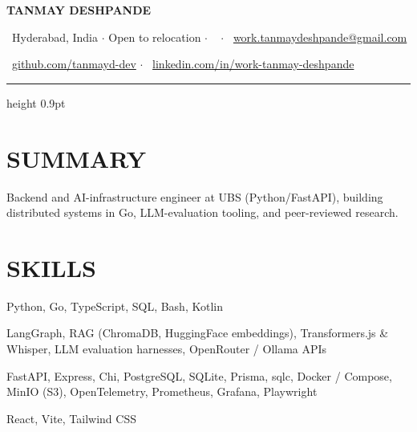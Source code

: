 \documentclass[10pt,a4paper]{article}
\newif\ifpublic
\newcommand{\contactphone}{}
\begin{document}
{\fontsize{23}{25}\selectfont\bfseries\color{accent} TANMAY DESHPANDE}\par
\vspace{3pt}
{\small\color{muted}
  \faMapMarker~Hyderabad, India \;$\cdot$\; Open to relocation
  \ifpublic\else\ifx\contactphone\empty\else\;$\cdot$\; \faPhone~\contactphone\fi\fi
  \;$\cdot$\; \faEnvelope~\href{mailto:work.tanmaydeshpande@gmail.com}{work.tanmaydeshpande@gmail.com}\par
  \vspace{1pt}
  \faGithub~\href{https://github.com/tanmayd-dev}{github.com/tanmayd-dev}
  \;$\cdot$\; \faLinkedin~\href{https://www.linkedin.com/in/work-tanmay-deshpande}{linkedin.com/in/work-tanmay-deshpande}
}\par
\vspace{2pt}
{\color{sepline}\hrule height 0.9pt}
\vspace{2pt}

\section*{SUMMARY}
{\small Backend and AI-infrastructure engineer at UBS (Python/FastAPI), building distributed systems in Go, LLM-evaluation tooling, and peer-reviewed research.}

\section*{SKILLS}
{\small
{}
\begin{description}[
  leftmargin=\dimexpr\dimen0+0.7em\relax, labelwidth=\dimen0, labelsep=0.7em,
  style=sameline, itemsep=0.8pt, topsep=0.4pt, parsep=0pt]
  \item[Languages:] Python, Go, TypeScript, SQL, Bash, Kotlin
  \item[AI \& LLM:] LangGraph, RAG (ChromaDB, HuggingFace embeddings), Transformers.js \& Whisper, LLM evaluation harnesses, OpenRouter / Ollama APIs
  \item[Backend \& Infra:] FastAPI, Express, Chi, PostgreSQL, SQLite, Prisma, sqlc, Docker / Compose, MinIO (S3), OpenTelemetry, Prometheus, Grafana, Playwright
  \item[Frontend:] React, Vite, Tailwind CSS
\end{description}
}

\end{document}
